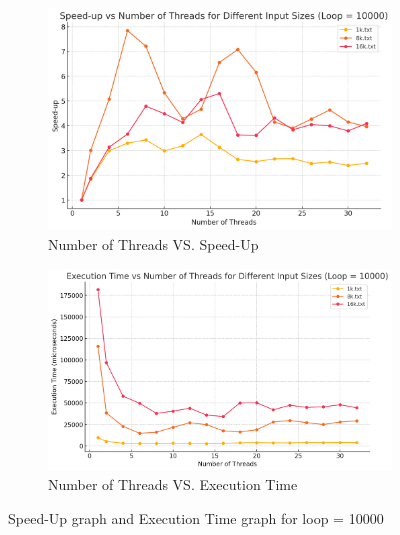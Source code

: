 \documentclass[letterpaper,12pt]{article}
\theoremstyle{remark}
\begin{document}
\hfill  %

\begin{figure}[H]
    \centering
    \begin{subfigure}[t]{0.48\textwidth}  %
        \centering
        \includegraphics[width=\textwidth]{loop10000Sleep.png}
        \caption{Number of Threads VS. Speed-Up}
        \label{fig:ThreadVsSpeedUp1}
    \end{subfigure}
    \hfill  %
    \begin{subfigure}[t]{0.48\textwidth}  %
        \centering
        \includegraphics[width=\textwidth]{loop10000ExecutionTime.png}
        \caption{Number of Threads VS. Execution Time}
        \label{fig:ThreadVsExecutionTime}
    \end{subfigure}
    \caption{Speed-Up graph and Execution Time graph for loop = 10000}
    \label{fig:ThreadVsComparison}
\end{figure}
\end{document}
